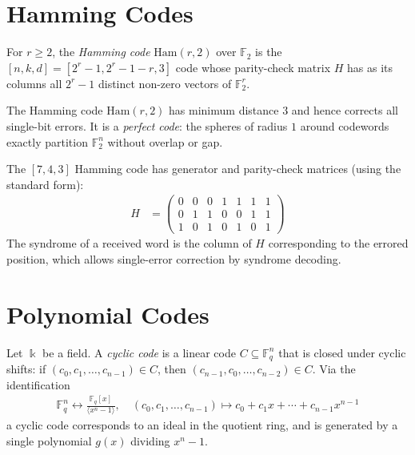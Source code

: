 \documentclass[a4paper, 12pt]{book} %
\begin{document}
\section{Hamming Codes}

\begin{definition}
    For $r \geq 2$, the \emph{Hamming code} $\mathrm{Ham}(r, 2)$ over $\mathbb{F}_2$ is the $[n, k, d] = [2^r - 1, 2^r - 1 - r, 3]$ code whose parity-check matrix $H$ has as its columns all $2^r - 1$ distinct non-zero vectors of $\mathbb{F}_2^r$.
\end{definition}

\begin{theorem}
    The Hamming code $\mathrm{Ham}(r, 2)$ has minimum distance $3$ and hence corrects all single-bit errors. It is a \emph{perfect code}: the spheres of radius $1$ around codewords exactly partition $\mathbb{F}_2^n$ without overlap or gap.
\end{theorem}

\begin{example}
    The $[7, 4, 3]$ Hamming code has generator and parity-check matrices (using the standard form):
    \begin{align}
        H &= \begin{pmatrix}
            0 & 0 & 0 & 1 & 1 & 1 & 1 \\
            0 & 1 & 1 & 0 & 0 & 1 & 1 \\
            1 & 0 & 1 & 0 & 1 & 0 & 1
        \end{pmatrix}
    \end{align}
    The syndrome of a received word is the column of $H$ corresponding to the errored position, which allows single-error correction by syndrome decoding.
\end{example}

\section{Polynomial Codes}

\begin{definition}
    Let $\Bbbk$ be a field. A \emph{cyclic code} is a linear code $C \subseteq \mathbb{F}_q^n$ that is closed under cyclic shifts: if $(c_0, c_1, \ldots, c_{n-1}) \in C$, then $(c_{n-1}, c_0, \ldots, c_{n-2}) \in C$. Via the identification
    \begin{align}
        \mathbb{F}_q^n \longleftrightarrow \frac{\mathbb{F}_q[x]}{\langle x^n - 1 \rangle}, \quad (c_0, c_1, \ldots, c_{n-1}) \longmapsto c_0 + c_1 x + \cdots + c_{n-1} x^{n-1}
    \end{align}
    a cyclic code corresponds to an ideal in the quotient ring, and is generated by a single polynomial $g(x)$ dividing $x^n - 1$.
\end{definition}
\end{document}
